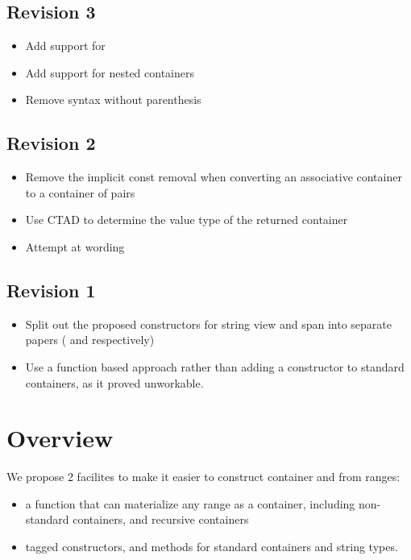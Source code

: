 \documentclass{wg21}
\begin{document}
\subsection*{Revision 3}
\begin{itemize}
    \item Add support for 
    \item Add support for nested containers
    \item Remove syntax without parenthesis
\end{itemize}

\subsection*{Revision 2}
\begin{itemize}
    \item Remove the implicit const removal when converting an associative container to a container of pairs
    \item Use CTAD to determine the value type of the returned container
    \item Attempt at wording
\end{itemize}

\subsection*{Revision 1}
\begin{itemize}
    \item Split out the proposed constructors for string view and span into separate papers (\cite{P1391} and \cite{P1394} respectively)
    \item Use a function based approach rather than adding a constructor to standard containers, as it proved unworkable.
\end{itemize}


\section{Overview}

We propose 2 facilites to make it easier to construct container and from ranges:

\begin{itemize}
\item {} a function that can materialize any range as a container, including non-standard containers, and recursive containers
\item tagged constructors,  and  methods for standard containers and string types.
\end{itemize}
\end{document}
